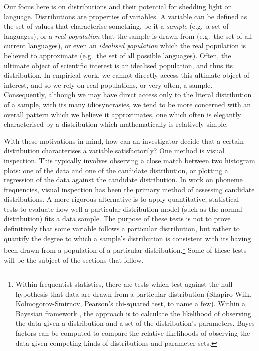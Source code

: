 Our focus here is on distributions and their potential for shedding light on language. Distributions are properties of variables. A variable can be defined as the set of values that characterise something, be it a \emph{sample} (e.g.~a set of languages), or a \emph{real population} that the sample is drawn from (e.g.~the set of all current languages), or even an \emph{idealised population} which the real population is believed to approximate (e.g.~the set of all possible languages). Often, the ultimate object of scientific interest is an idealised population, and thus its distribution. In empirical work, we cannot directly access this ultimate object of interest, and so we rely on real populations, or very often, a sample. Consequently, although we may have direct access only to the literal distribution of a sample, with its many idiosyncrasies, we tend to be more concerned with an overall pattern which we believe it approximates, one which often is elegantly characterised by a distribution which mathematically is relatively simple.

With these motivations in mind, how can an investigator decide that a certain distribution characterises a variable satisfactorily? One method is visual inspection. This typically involves observing a close match between two histogram plots: one of the data and one of the candidate distribution, or plotting a regression of the data against the candidate distribution. In work on phoneme frequencies, visual inspection has been the primary method of assessing candidate distributions. A more rigorous alternative is to apply quantitative, statistical tests to evaluate how well a particular distribution model (such as the normal distribution) fits a data sample. The purpose of these tests is not to prove definitively that some variable follows a particular distribution, but rather to quantify the degree to which a sample's distribution is consistent with its having been drawn from a population of a particular distribution.\footnote{Within frequentist statistics, there are tests which test against the null hypothesis that data are drawn from a particular distribution (Shapiro-Wilk, Kolmogorov-Smirnov, Pearson's chi-squared test, to name a few). Within a Bayesian framework \autocites{spiegelhalter_omnibus_1980}{farrell_comprehensive_2006}, the approach is to calculate the likelihood of observing the data given a distribution and a set of the distribution's parameters. Bayes factors can be computed to compare the relative likelihoods of observing the data given competing kinds of distributions and parameter sets.} Some of these tests will be the subject of the sections that follow.


